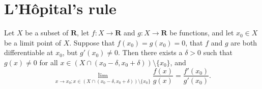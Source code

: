 \section{L'Hôpital's rule}\label{sec 10.5}

\begin{proposition}\label{10.5.1}
    Let \(X\) be a subset of \(\mathbf{R}\), let \(f : X \to \mathbf{R}\) and \(g : X \to \mathbf{R}\) be functions, and let \(x_0 \in X\) be a limit point of \(X\).
    Suppose that \(f(x_0) = g(x_0) = 0\), that \(f\) and \(g\) are both differentiable at \(x_0\), but \(g'(x_0) \neq 0\).
    Then there exists a \(\delta > 0\) such that \(g(x) \neq 0\) for all \(x \in (X \cap (x_0 - \delta, x_0 + \delta)) \setminus \{x_0\}\), and
    \[
        \lim_{x \to x_0 ; x \in (X \cap (x_0 - \delta, x_0 + \delta)) \setminus \{x_0\}} \frac{f(x)}{g(x)} = \frac{f'(x_0)}{g'(x_0)}.
    \]
\end{proposition}


